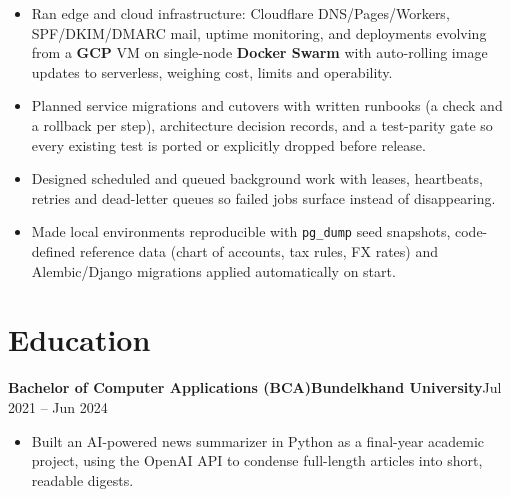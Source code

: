\documentclass[11pt,a4paper]{article}
\newcommand{\entry}[3]{%
  \vspace{4.5pt}\noindent\textbf{#1}\hfill\textbf{#2}\hfill{\color{subtlegray}#3}\par\vspace{2pt}}
\begin{document}
\begin{itemize}
        ledger reconciliation, plus Indian GST e-invoicing (EINV-2.1) through the
        NIC gateway with IRN generation and signed QR codes.
  \item Ran edge and cloud infrastructure: Cloudflare DNS/Pages/Workers,
        SPF/DKIM/DMARC mail, uptime monitoring, and deployments evolving from a
        \textbf{GCP} VM on single-node \textbf{Docker Swarm} with auto-rolling
        image updates to serverless, weighing cost, limits and operability.
  \item Planned service migrations and cutovers with written runbooks (a check
        and a rollback per step), architecture decision records, and a test-parity
        gate so every existing test is ported or explicitly dropped before release.
  \item Designed scheduled and queued background work with leases,
        heartbeats, retries and dead-letter queues so failed jobs surface
        instead of disappearing.
  \item Made local environments reproducible with \texttt{pg\_dump} seed
        snapshots, code-defined reference data (chart of accounts, tax rules,
        FX rates) and Alembic/Django migrations applied automatically on start.
\end{itemize}

\section{Education}
\entry{Bachelor of Computer Applications (BCA)}{Bundelkhand University}{Jul 2021 -- Jun 2024}
\begin{itemize}
  \item Built an AI-powered news summarizer in Python as a final-year academic
        project, using the OpenAI API to condense full-length articles into short,
        readable digests.
\end{itemize}

\end{document}
